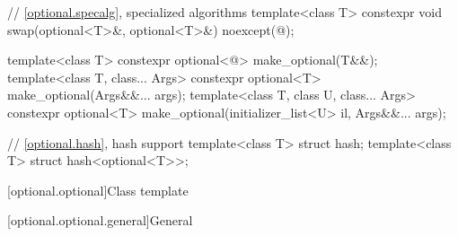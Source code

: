 \begin{codeblock}
{  // \ref{optional.specalg}, specialized algorithms
  template<class T>
    constexpr void swap(optional<T>&, optional<T>&) noexcept(@\seebelow@);

  template<class T>
    constexpr optional<@\seebelow@> make_optional(T&&);
  template<class T, class... Args>
    constexpr optional<T> make_optional(Args&&... args);
  template<class T, class U, class... Args>
    constexpr optional<T> make_optional(initializer_list<U> il, Args&&... args);

  // \ref{optional.hash}, hash support
  template<class T> struct hash;
  template<class T> struct hash<optional<T>>;
}
\end{codeblock}

[optional.optional]{Class template }

[optional.optional.general]{General}

